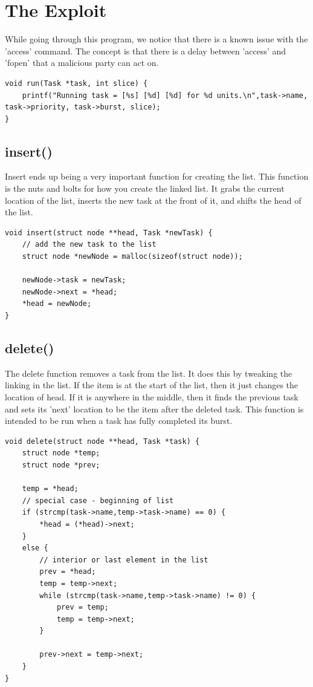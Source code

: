 \documentclass[10pt]{article}
\begin{document}
\section{The Exploit}
While going through this program, we notice that there is a known issue with the 'access' command.  The concept is that there is a delay between 'access' and 'fopen' that a malicious party can act on.  

\begin{verbatim}
void run(Task *task, int slice) {
    printf("Running task = [%s] [%d] [%d] for %d units.\n",task->name, task->priority, task->burst, slice);
}
\end{verbatim}

\subsection{insert()}
Insert ends up being a very important function for creating the list.  This function is the nuts and bolts for how you create the linked list.  It grabs the current location of the list, inserts the new task at the front of it, and shifts the head of the list.

\begin{verbatim}
void insert(struct node **head, Task *newTask) {
    // add the new task to the list 
    struct node *newNode = malloc(sizeof(struct node));

    newNode->task = newTask;
    newNode->next = *head;
    *head = newNode;
}
\end{verbatim}
\subsection{delete()}
The delete function removes a task from the list.  It does this by tweaking the linking in the list.  If the item is at the start of the list, then it just changes the location of head.  If it is anywhere in the middle, then it finds the previous task and sets its 'next' location to be the item after the deleted task.  This function is intended to be run when a task has fully completed its burst. 

\begin{verbatim}
void delete(struct node **head, Task *task) {
    struct node *temp;
    struct node *prev;

    temp = *head;
    // special case - beginning of list
    if (strcmp(task->name,temp->task->name) == 0) {
        *head = (*head)->next;
    }
    else {
        // interior or last element in the list
        prev = *head;
        temp = temp->next;
        while (strcmp(task->name,temp->task->name) != 0) {
            prev = temp;
            temp = temp->next;
        }

        prev->next = temp->next;
    }
}
\end{verbatim}
\end{document}
